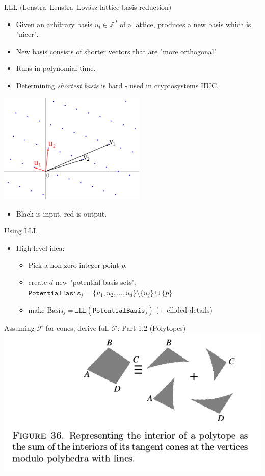 \documentclass[8pt]{beamer}
\begin{document}
\begin{frame}[label=sec-21]{LLL  (Lenstra–Lenstra–Lovász lattice basis reduction)}
\begin{itemize}
\item Given an arbitrary basis $u_i \in \mathbb{Z}^d$ of a lattice, produces a new basis which is "nicer".
\item New basis consists of shorter vectors that are "more orthogonal"
\item Runs in polynomial time.
\item Determining \textit{shortest basis} is hard - used in cryptosystems IIUC.
\end{itemize}

\begin{center}
\includegraphics[width=7cm, keepaspectratio]{res/lattice-reduction}
\end{center}
\begin{itemize}
\item Black is input, red is output.
\end{itemize}
\end{frame}


\begin{frame}[label=sec-22]{Using LLL}
\begin{itemize}
\item High level idea:
\begin{itemize}
\item Pick a non-zero integer point $p$.
\item create $d$ new "potential basis sets", $\texttt{PotentialBasis}_j = \{u_1, u_2 , \ldots, u_d\} \setminus \{u_j\} \cup \{p\}$
\item make $\text{Basis}_j = \texttt{LLL}(\texttt{PotentialBasis}_j)$  (+ ellided details)
\end{itemize}
\end{itemize}
\end{frame}

\begin{frame}[label=sec-23]{Assuming $\mathcal{F}$ for cones, derive full $\mathcal{F}$: Part 1.2 (Polytopes)}
\includegraphics[width=.9\linewidth]{./res/polytope-as-sum-of-tangent-cones.png}
\end{frame}
\end{document}
